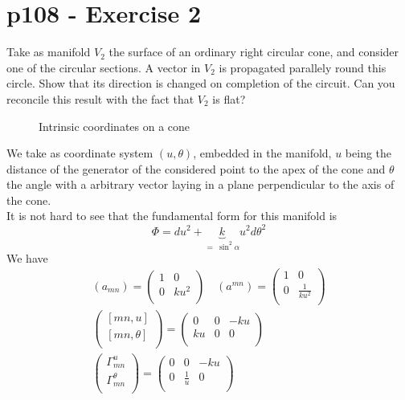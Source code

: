 \section{p108 - Exercise 2}
\begin{tcolorbox}
Take as manifold $V_2$ the surface of an ordinary right circular cone, and consider one of the circular sections. A vector in $V_2$ is propagated parallely round this circle. Show that its direction is changed on completion of the circuit. Can you reconcile this result with the fact that $V_2$ is flat?
\end{tcolorbox}
\begin{figure}[h]
\center

\caption{Intrinsic coordinates on  a cone}
\label{fig:fig_p108_Ex2_a}
\end{figure}
We take as coordinate system $\left(u,\theta \right)$, embedded in the manifold, $u$ being the distance of the generator of the considered point to the apex of the cone and $\theta$ the angle with a arbitrary vector laying in a plane perpendicular to the axis of the cone.\\
It is not hard to see that the fundamental form for this manifold is $$ \Phi = du^2+ \underbrace{k}_{= \ \sin^2 \alpha}u^2 d\theta^2 $$ 
We have 
\begin{align*}
 (a_{mn})= \begin{pmatrix}
 1&0  \\
 0& k u^2 \\
\end{pmatrix}\quad
 (a^{mn})= \begin{pmatrix}
 1&0  \\
 0& \frac{1}{k u^2} \\
\end{pmatrix}\\
 \begin{pmatrix}
 \left[ mn,u \right] \\
 \left[ mn,\theta \right] \\
\end{pmatrix}=\begin{pmatrix}
 0&0&-k u \\
 k u&0&0 \\
\end{pmatrix}\\
 \begin{pmatrix}
 \Gamma^u_{mn} \\
 \Gamma^{\theta}_{mn} \\
\end{pmatrix}=\begin{pmatrix}
 0&0&-k u \\
 0&\frac{1}{u}&0 \\
\end{pmatrix}
\end{align*}

